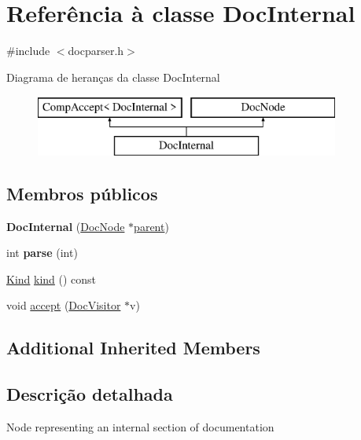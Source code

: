 \hypertarget{class_doc_internal}{\section{Referência à classe Doc\-Internal}
\label{class_doc_internal}
}


{\ttfamily \#include $<$docparser.\-h$>$}

Diagrama de heranças da classe Doc\-Internal\begin{figure}[H]
\begin{center}
\leavevmode
\includegraphics[height=2.000000cm]{class_doc_internal}
\end{center}
\end{figure}
\subsection*{Membros públicos}
\begin{DoxyCompactItemize}
\item 
\hypertarget{class_doc_internal_a36adc36e20541e80f5e13bc8a5e3df8e}{{\bfseries Doc\-Internal} (\hyperlink{class_doc_node}{Doc\-Node} $\ast$\hyperlink{class_doc_node_abd7f070d6b0a38b4da71c2806578d19d}{parent})}\label{class_doc_internal_a36adc36e20541e80f5e13bc8a5e3df8e}

\item 
\hypertarget{class_doc_internal_aeb9000bd66b24b2d31c79d29537be71e}{int {\bfseries parse} (int)}\label{class_doc_internal_aeb9000bd66b24b2d31c79d29537be71e}

\item 
\hyperlink{class_doc_node_aa10c9e8951b8ccf714a59ec321bdac5b}{Kind} \hyperlink{class_doc_internal_aa9d037bed9f9a083d0cd01485637d843}{kind} () const 
\item 
void \hyperlink{class_doc_internal_a7ba716e854ae2f8f87a4eb2140e302b6}{accept} (\hyperlink{class_doc_visitor}{Doc\-Visitor} $\ast$v)
\end{DoxyCompactItemize}
\subsection*{Additional Inherited Members}


\subsection{Descrição detalhada}
Node representing an internal section of documentation 

